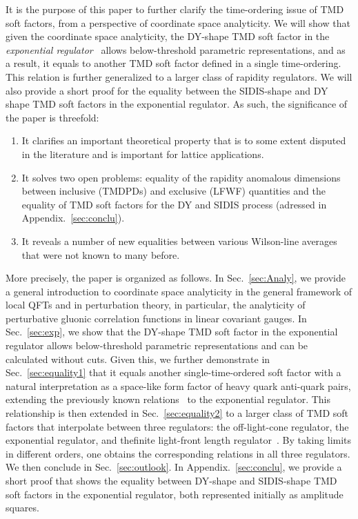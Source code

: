 \documentclass[a4paper,11pt]{article}
\begin{document}
It is the purpose of this paper to further clarify the time-ordering issue of TMD soft factors, from a perspective of coordinate space analyticity. We will show that given the coordinate space analyticity, the DY-shape TMD soft factor in the {\it exponential regulator}~\cite{Li:2016axz,Moult:2018jzp} allows below-threshold parametric representations, and as a result, it equals to another TMD soft factor defined in a single time-ordering. This relation is further generalized to a larger class of rapidity regulators. We will also provide a short proof for the equality between the SIDIS-shape and DY shape TMD soft factors in the exponential regulator. As such, the significance of the paper is threefold:
\begin{enumerate}
    \item It clarifies an important theoretical property that is to some extent disputed in the literature and is important for lattice applications.
    \item It solves two open problems: equality of the rapidity anomalous dimensions between inclusive (TMDPDs) and exclusive (LFWF) quantities and the equality of TMD soft factors for the DY and SIDIS process (adressed in Appendix.~\ref{sec:conclu}). 
    \item It reveals a number of new equalities between various Wilson-line averages that were not known to many before. 
\end{enumerate}
More precisely, the paper is organized as follows. In Sec.~\ref{sec:Analy}, we provide a general introduction to coordinate space analyticity in the general framework of local QFTs and in perturbation theory, in particular, the analyticity of perturbative gluonic correlation functions in linear covariant gauges. In Sec.~\ref{sec:exp}, we show that the DY-shape TMD soft factor in the exponential regulator allows below-threshold parametric representations and can be calculated without cuts. Given this, we further demonstrate in Sec.~\ref{sec:equality1} that it equals another single-time-ordered soft factor with a natural interpretation as a space-like form factor of heavy quark anti-quark pairs, extending the previously known relations~\cite{Ji:2019sxk,Ji:2020ect,Liu:2022nnk} to the exponential regulator. This relationship is then extended in Sec.~\ref{sec:equality2} to a larger class of TMD soft factors that interpolate between three regulators: the off-light-cone regulator, the exponential regulator, and thefinite light-front length regulator~\cite{Vladimirov:2017ksc,Vladimirov:2020umg}. By taking limits in different orders, one obtains the corresponding relations in all three regulators.  We then conclude in Sec.~\ref{sec:outlook}. In Appendix.~\ref{sec:conclu}, we provide a short proof that shows the equality between DY-shape and SIDIS-shape TMD soft factors in the exponential regulator, both represented initially as amplitude squares.
\end{document}
